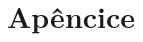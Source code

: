 \documentclass[11pt,fleqn]{book} %
\begin{document}
%


\chapter{Apêncice}\label{apendice}
\vspace{6em}
\begin{flushright}
	\textit{\textcolor{white}{}}
\end{flushright}
\vspace{12em}
\end{document}
